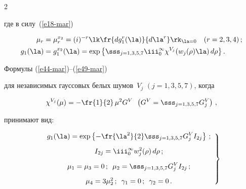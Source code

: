 \begin{multicols}{2}
\begin{equation}
    \end{equation}


где в силу~(\ref{e18-mar})


\begin{align*}


\mu_r &= \mu_r^{x_2}= (i)^{-r} \lk \fr{d g_1^r(\la)}{d \la^r}\rk_{\la=0} \quad (r=2,3,4)\,;\\




g_1(\la) &=g_1^{x_2}(\la) =\exp\left\{ \sss_{j=1,3,5,7}\iii_0^\infty \chi^{V_j} (w_j (\rho) \la) \,d


\rho\right\}. %


\end{align*}





Формулы (\ref{e44-mar})--(\ref{e49-mar}) 


 для независимых гауссовых белых шумов~$V_j$ $(j=1,3,5,7)$, когда


    \begin{equation*}


    \chi^{V_j} (\mu) =-\fr{1}{2}\, \mu^2 G^V\enskip  \left( G^V =\sss_{j=1,3,5,7} G_j^V\right)\,,




    \end{equation*}


принимают вид:


     \begin{equation}


     \left.\begin{array}{c}


     g_1(\la) =\displaystyle \exp\left\{ -\fr{\la^2}{2}\sss_{j=1,3,5,7} G_j^V I_{2j}\right\}\,;\\[9pt]


     I_{2j} =\displaystyle\iii_0^\infty w_j^2 (\rho)\, d\rho\,;\\[9pt]


     \mu_1 =\mu_3=0\,;\enskip \mu_2 =\displaystyle\sss_{j=1,3,5,7} G_j^V I_{2j}\,;\\[9pt]


     \mu_4 = 3 \mu_2^2\,; \enskip     \gamma_1=0\,;\enskip \gamma_2 =0\,.


     \end{array}


     \right\}


     \label{e53-mar}



\end{equation}
\end{multicols}
